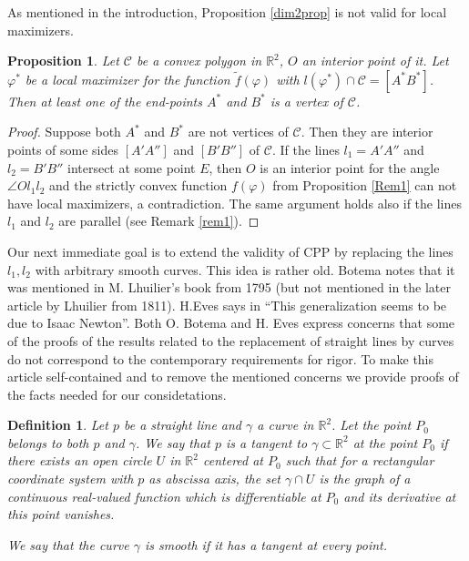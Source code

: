 \documentclass[a4paper,12pt]{amsart}
\newtheorem{prop}[thm]{Proposition}
\newtheorem{defi}[thm]{Definition}
\begin{document}
As mentioned in the introduction, Proposition \ref{dim2prop} is not valid for local maximizers.

\begin{prop} \label{polygon}
Let $\mathcal C$ be a convex polygon in $\mathbb R^2$, $O$ an interior point of it. Let
$\varphi^*$  be a local maximizer for the function
$\tilde{f}(\varphi)$ with $l(\varphi^*) \cap \mathcal C =
[A^*B^*]$.  Then at least one of the end-points $A^*$ and $B^*$ is
a vertex of $\mathcal{C}$.

\end{prop}

\begin{proof}
Suppose both $A^*$ and $B^*$ are not vertices of $\mathcal C$.
Then they are interior points of some sides $[A'A'']$ and $[B'B'']$
of $\mathcal C$. If the lines $l_1=A'A''$ and $l_2 =B'B''$
intersect at some point $E$, then $O$ is an interior point for the
angle $\angle Ol_1l_2$  and the strictly convex function
$f(\varphi)$  from Proposition \ref{Rem1} can not have local
maximizers, a contradiction. The same argument holds also if the
lines $l_1$ and $l_2$ are parallel (see Remark \ref{rem1}).

\end{proof}


 Our next immediate goal is to extend the validity of CPP by replacing the lines $l_1, l_2$ with arbitrary smooth curves. This idea is rather old. Botema \cite{Bot} notes that it was mentioned in M. Lhuilier's book \cite{ML} from 1795 (but not mentioned in the later article by Lhuilier \cite{ML1} from 1811). H.Eves says in \cite{EVES} ``This generalization seems to be due to Isaac Newton''. Both O. Botema and H. Eves express concerns that some of the proofs of the results related to the replacement of straight lines by curves do not correspond to the contemporary requirements for rigor.  To make this article self-contained and to remove the mentioned concerns we provide proofs of the facts needed for our considetations.


\begin{defi}
Let $p$ be a straight line and $\gamma$ a curve in $\mathbb{R}^2
$. Let the point $P_0$ belongs to both $p$ and $\gamma$. We say
that $p$ is a tangent to $\gamma \subset \mathbb{R}^2 $ at the
point $P_ 0$ if there exists an open circle $U$ in $\mathbb{R}^2$
centered at $P_0$ such that for a rectangular coordinate system
with  $p$ as abscissa axis, the set $\gamma \cap U$ is the graph
of a continuous real-valued function which is differentiable at
$P_0$ and its derivative at this point vanishes.

We say that the curve $\gamma$ is smooth if it has a tangent at every point.
\end{defi}
\end{document}
